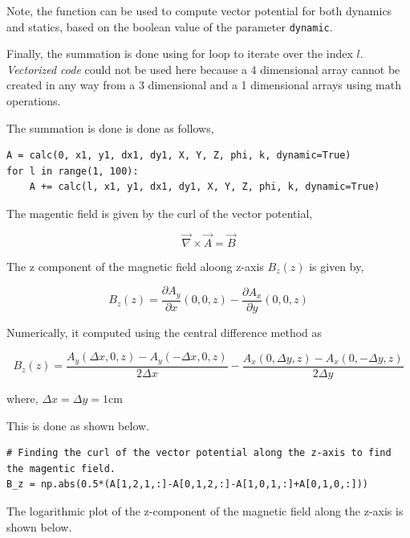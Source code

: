 \documentclass[12pt, a4paper]{article}
\begin{document}
Note, the function can be used to compute vector potential for both dynamics and statics, based on the boolean value of the parameter \texttt{dynamic}.

Finally, the summation is done using for loop to iterate over the index $l$. \textit{Vectorized code} could not be used here because a 4 dimensional array cannot be created in any way from a 3 dimensional and a 1 dimensional arrays using math operations.

The summation is done is done as follows,

\begin{lstlisting}
A = calc(0, x1, y1, dx1, dy1, X, Y, Z, phi, k, dynamic=True)
for l in range(1, 100):
    A += calc(l, x1, y1, dx1, dy1, X, Y, Z, phi, k, dynamic=True)
\end{lstlisting}

The magentic field is given by the curl of the vector potential,

\begin{equation*}
\vec{\nabla} \times \vec{A} = \vec{B}
\end{equation*}

The z component of the magnetic field aloong z-axis $B_z(z)$ is given by,

\begin{equation*}
B_z(z) = \frac{\partial A_y}{\partial x} (0,0,z) - \frac{\partial A_x}{\partial y} (0,0,z)
\end{equation*}

Numerically, it computed using the central difference method as 

\begin{equation*}
B_z(z) = \frac{A_y(\Delta x, 0, z) - A_y(-\Delta x, 0, z)}{2\Delta x} - \frac{A_x(0, \Delta y, z) - A_x(0, -\Delta y, z)}{2\Delta y}
\end{equation*}

where, $\Delta x = \Delta y = 1$cm

This is done as shown below.

\begin{lstlisting}
# Finding the curl of the vector potential along the z-axis to find the magentic field.
B_z = np.abs(0.5*(A[1,2,1,:]-A[0,1,2,:]-A[1,0,1,:]+A[0,1,0,:]))
\end{lstlisting}

The logarithmic plot of the z-component of the magnetic field along the z-axis is shown below.
\end{document}
